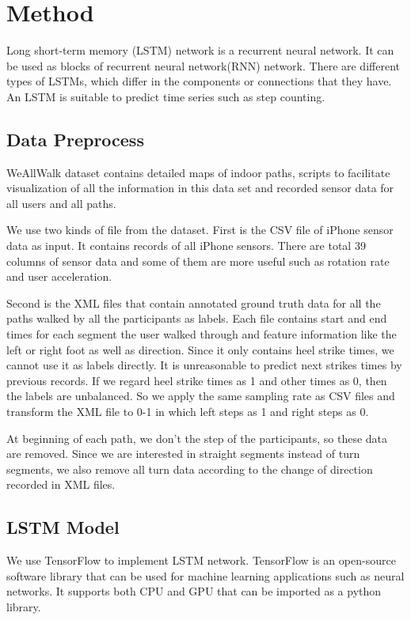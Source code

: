 \documentclass[11pt]{article}
\begin{document}
\section{Method}
Long short-term memory (LSTM) network is a recurrent neural network. It can be used as blocks of recurrent neural network(RNN) network. There are different types of LSTMs, which differ in the components or connections that they have. An LSTM is suitable to predict time series such as step counting.

\subsection{Data Preprocess}
WeAllWalk dataset contains detailed maps of indoor paths, scripts to facilitate visualization of all the information in this data set and recorded sensor data for all users and all paths.

We use two kinds of file from the dataset. First is the CSV file of iPhone sensor data as input. It contains records of all iPhone sensors. There are total 39 columns of sensor data and some of them are more useful such as rotation rate and user acceleration.

Second is the XML files that contain annotated ground truth data for all the paths walked by all the participants as labels. Each file contains start and end times for each segment the user walked through and feature information like the left or right foot as well as direction. Since it only contains heel strike times, we cannot use it as labels directly. It is unreasonable to predict next strikes times by previous records. If we regard heel strike times as 1 and other times as 0, then the labels are unbalanced. So we apply the same sampling rate as CSV files and transform the XML file to 0-1 in which left steps as 1 and right steps as 0.

At beginning of each path, we don't the step of the participants, so these data are removed. Since we are interested in straight segments instead of turn segments, we also remove all turn data according to the change of direction recorded in XML files.



\subsection{LSTM Model}
We use TensorFlow to implement LSTM network. TensorFlow is an open-source software library that can be used for machine learning applications such as neural networks. It supports both CPU and GPU that can be imported as a python library.
\end{document}
